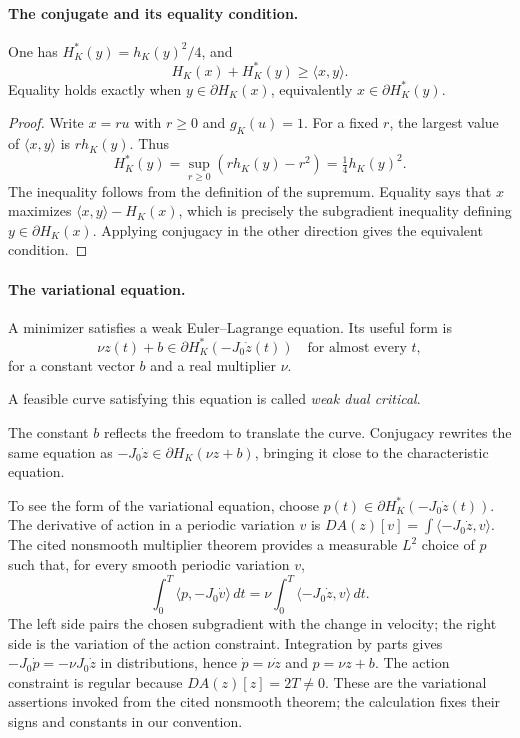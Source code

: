 \paragraph{The conjugate and its equality condition.}
\begin{lemma}\label{lem:preliminaries-fenchel-duality}
One has $H_K^*(y)=h_K(y)^2/4$, and
\[
 H_K(x)+H_K^*(y)\geq\langle x,y\rangle.
\]
Equality holds exactly when $y\in\partial H_K(x)$, equivalently
$x\in\partial H_K^*(y)$.
\end{lemma}
\begin{proof}
Write $x=ru$ with $r\geq0$ and $g_K(u)=1$. For a fixed $r$, the largest
value of $\langle x,y\rangle$ is $r h_K(y)$. Thus
\[
 H_K^*(y)=\sup_{r\geq0}(r h_K(y)-r^2)=\tfrac14h_K(y)^2.
\]
The inequality follows from the definition of the supremum. Equality says
that $x$ maximizes $\langle x,y\rangle-H_K(x)$, which is precisely the
subgradient inequality defining $y\in\partial H_K(x)$. Applying conjugacy
in the other direction gives the equivalent condition.
\end{proof}

\paragraph{The variational equation.}
A minimizer satisfies a weak Euler--Lagrange equation. Its useful form is
\begin{equation}\label{eq:preliminaries-dual-euler-lagrange}
 \nu z(t)+b\in\partial H_K^*(-J_0\dot z(t))
 \quad\text{for almost every }t,
\end{equation}
for a constant vector $b$ and a real multiplier $\nu$.
\begin{definition}
\label{def:preliminaries-weak-dual-critical}
A feasible curve
satisfying this equation is called \emph{weak dual critical}.
\end{definition}
The constant $b$ reflects the freedom to translate the curve. Conjugacy
rewrites the same equation as
$-J_0\dot z\in\partial H_K(\nu z+b)$, bringing it close to the
characteristic equation.

To see the form of the variational equation, choose
$p(t)\in\partial H_K^*(-J_0\dot z(t))$. The derivative of action in a
periodic variation $v$ is $DA(z)[v]=\int\langle-J_0\dot z,v\rangle$.
The cited nonsmooth multiplier theorem provides a measurable $L^2$ choice
of $p$ such that, for every smooth periodic variation $v$,
\[
 \int_0^T\langle p,-J_0\dot v\rangle\,dt
 =\nu\int_0^T\langle-J_0\dot z,v\rangle\,dt.
\]
The left side pairs the chosen subgradient with the change in velocity;
the right side is the variation of the action constraint.
Integration by parts gives
$-J_0\dot p=-\nu J_0\dot z$ in distributions, hence
$\dot p=\nu\dot z$ and $p=\nu z+b$. The action constraint is regular
because $DA(z)[z]=2T\ne0$. These are the variational assertions invoked
from the cited nonsmooth theorem; the calculation fixes their signs and
constants in our convention.

